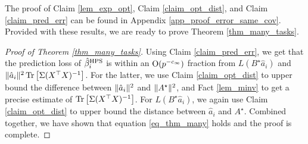 	The proof of Claim \ref{lem_exp_opt}, Claim \ref{claim_opt_dist}, and Claim \ref{claim_pred_err} can be found in Appendix \ref{app_proof_error_same_cov}.
	Provided with these results, we are ready to prove Theorem \ref{thm_many_tasks}.
	\begin{proof}[Proof of Theorem \ref{thm_many_tasks}]
		Using Claim \ref{claim_pred_err}, we get that the prediction loss of $\hat{\beta}_i^{\textup{HPS}}$ is within an $\operatorname{O}(p^{-c_{\infty}})$ fraction from $L(B^{\star}\hat{a}_i)$ and $\|\hat{a}_i\|^2 \operatorname{Tr}\left[\Sigma(X^{\top}X)^{-1}\right]$.
		For the latter, we use Claim \ref{claim_opt_dist} to upper bound the difference between $\|\hat{a}_i\|^2$ and $\|A^{\star}\|^2$, and Fact \ref{lem_minv} to get a precise estimate of $\operatorname{Tr}\left[\Sigma (X^{\top}X)^{-1}\right]$.
		For $L(B^{\star}\hat{a}_i)$, we again use Claim \ref{claim_opt_dist} to upper bound the distance between $\hat{a}_i$ and $A^{\star}$.
		Combined together, we have shown that equation \eqref{eq_thm_many} holds and the proof is complete.
	\end{proof}

